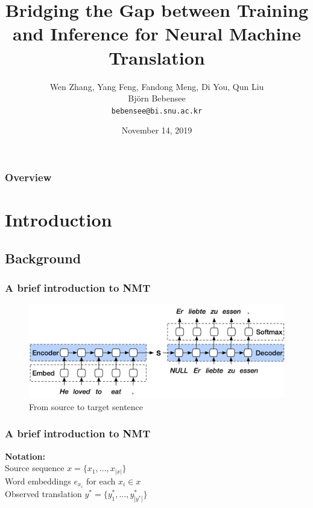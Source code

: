 \documentclass{beamer}
\title{Bridging the Gap between Training and Inference for Neural Machine Translation}
\author[Bj\"orn Bebensee]{
    Wen Zhang, Yang Feng, Fandong Meng, Di You, Qun Liu\\
    \bigskip
    Bj\"orn Bebensee\\
    \medskip
    {\tt bebensee@bi.snu.ac.kr} 
}
\institute[Biointelligence Laboratory]{
    \normalsize Biointelligence Laboratory
}
\date{November 14, 2019}
\begin{document}
\begin{frame}
    \titlepage
\end{frame}

\begin{frame}
    \frametitle{Overview}
    \tableofcontents
\end{frame}



\section{Introduction}

\subsection{Background}


\begin{frame}
    \frametitle{A brief introduction to NMT}
    \begin{figure}
        \centering
        \includegraphics[width=\textwidth]{fig/nmt}
        \caption{From source to target sentence}
    \end{figure}
\end{frame}


\begin{frame}
    \frametitle{A brief introduction to NMT}
    \textbf{Notation:}\\
    \bigskip
    Source sequence $x = \{ x_1, \ldots, x_{|x|} \}$\\
    \medskip
    Word embeddings $e_{x_i}$ for each $x_i \in x$\\
    \medskip
    Observed translation $y^* = \{ y_1^*, \ldots, y^*_{|y^*|} \}$
\end{frame}
\end{document}
